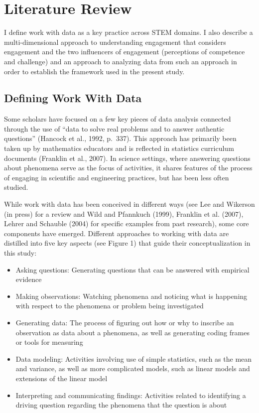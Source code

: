 \documentclass[]{msu-thesis}
\providecommand{\tightlist}{%
  \setlength{\itemsep}{0pt}\setlength{\parskip}{0pt}}
\theoremstyle{definition}
\theoremstyle{definition}
\theoremstyle{definition}
\theoremstyle{remark}
\begin{document}
\chapter{Literature Review}\label{literature-review}

I define work with data as a key practice across STEM domains. I also
describe a multi-dimensional approach to understanding engagement that
considers engagement and the two influencers of engagement (perceptions
of competence and challenge) and an approach to analyzing data from such
an approach in order to establish the framework used in the present
study.

\section{Defining Work With Data}\label{defining-work-with-data}

Some scholars have focused on a few key pieces of data analysis
connected through the use of ``data to solve real problems and to answer
authentic questions'' (Hancock et al., 1992, p.~337). This approach has
primarily been taken up by mathematics educators and is reflected in
statistics curriculum documents (Franklin et al., 2007). In science
settings, where answering questions about phenomena serve as the focus
of activities, it shares features of the process of engaging in
scientific and engineering practices, but has been less often studied.

While work with data has been conceived in different ways (see Lee and
Wikerson (in press) for a review and Wild and Pfannkuch (1999), Franklin
et al. (2007), Lehrer and Schauble (2004) for specific examples from
past research), some core components have emerged. Different approaches
to working with data are distilled into five key aspects (see Figure 1)
that guide their conceptualization in this study:

\begin{itemize}
\tightlist
\item
  Asking questions: Generating questions that can be answered with
  empirical evidence
\item
  Making observations: Watching phenomena and noticing what is happening
  with respect to the phenomena or problem being investigated
\item
  Generating data: The process of figuring out how or why to inscribe an
  observation as data about a phenomena, as well as generating coding
  frames or tools for measuring
\item
  Data modeling: Activities involving use of simple statistics, such as
  the mean and variance, as well as more complicated models, such as
  linear models and extensions of the linear model
\item
  Interpreting and communicating findings: Activities related to
  identifying a driving question regarding the phenomena that the
  question is about
\end{itemize}
\end{document}
